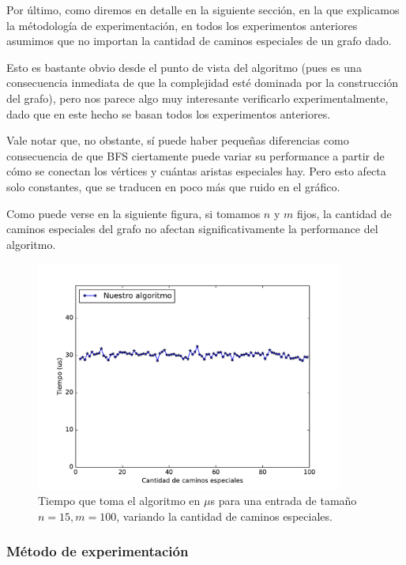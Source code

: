 Por último, como diremos en detalle en la siguiente sección, en la que explicamos la métodología de experimentación, en todos los experimentos anteriores asumimos que no importan la cantidad de caminos especiales de un grafo dado.

Esto es bastante obvio desde el punto de vista del algoritmo (pues es una consecuencia inmediata de que la complejidad esté dominada por la construcción del grafo), pero nos parece algo muy interesante verificarlo experimentalmente, dado que en este hecho se basan todos los experimentos anteriores.

Vale notar que, no obstante, sí puede haber pequeñas diferencias como consecuencia de que BFS ciertamente puede variar su performance a partir de cómo se conectan los vértices y cuántas aristas especiales hay. Pero esto afecta solo constantes, que se traducen en poco más que ruido en el gráfico.

Como puede verse en la siguiente figura, si tomamos $n$ y $m$ fijos, la cantidad de caminos especiales del grafo no afectan significativamente la performance del algoritmo.

\begin{figure}[H]
 \centering
	\includegraphics[width=0.9\textwidth]{img/exp/problema1-especiales.pdf}
	\caption{\footnotesize Tiempo que toma el algoritmo en $\mu$s para una entrada de tamaño $n = 15, m = 100$, variando la cantidad de caminos especiales.}
	\label{fig:problema1-especiales}
\end{figure}



\subsubsection{M\'etodo de experimentación}

